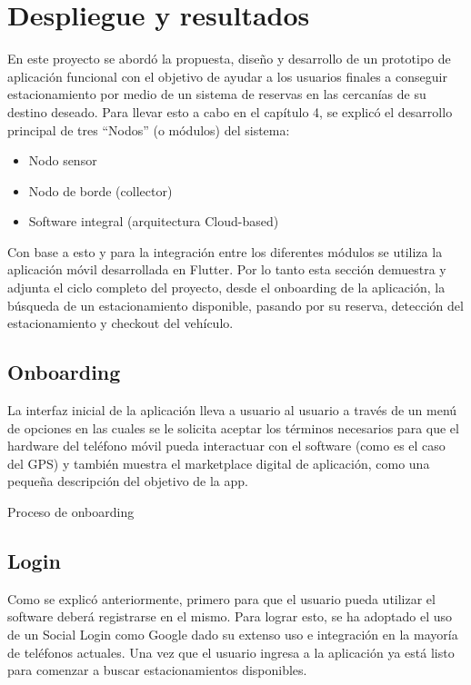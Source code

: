 \clearpage
\section{Despliegue y resultados}
En este proyecto se abordó la propuesta, diseño y desarrollo de un prototipo de aplicación funcional con el objetivo de ayudar a los usuarios finales a conseguir estacionamiento por medio de un sistema de reservas en las cercanías de su destino deseado.
Para llevar esto a cabo en el capítulo 4, se explicó el desarrollo principal de tres “Nodos” (o módulos) del sistema:

\begin{itemize}
    \item Nodo sensor
    \item Nodo de borde (collector)
    \item Software integral (arquitectura Cloud-based)
\end{itemize}

Con base a esto y para la integración entre los diferentes módulos se utiliza la aplicación móvil desarrollada en Flutter. Por lo tanto esta sección demuestra y adjunta el ciclo completo del proyecto, desde el onboarding de la aplicación, la búsqueda de un estacionamiento disponible, pasando por su reserva, detección del estacionamiento y checkout del vehículo.

\subsection{Onboarding}
La interfaz inicial de la aplicación lleva a usuario al usuario a través de un menú de opciones en las cuales se le solicita aceptar los términos necesarios para que el hardware del teléfono móvil pueda interactuar con el software (como es el caso del GPS) y también muestra el marketplace digital de aplicación, como una pequeña descripción del objetivo de la app.

\begin{images}[\label{onboarding_process}]{Proceso de onboarding}
\end{images}

\subsection{Login}
Como se explicó anteriormente, primero para que el usuario pueda utilizar el software deberá registrarse en el mismo. Para lograr esto, se ha adoptado el uso de un Social Login como Google dado su extenso uso e integración en la mayoría de teléfonos actuales. Una vez que el usuario ingresa a la aplicación ya está listo para comenzar a buscar estacionamientos disponibles.

